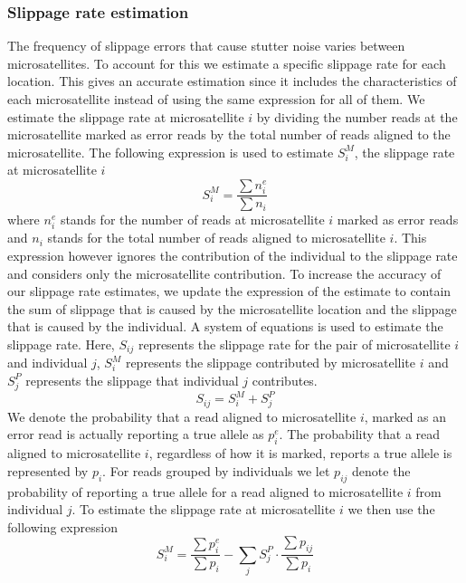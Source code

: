 \documentclass{bioinfo}
\begin{document}
\begin{methods}
\subsubsection{Slippage rate estimation}
The frequency of slippage errors that cause stutter noise varies between microsatellites. To account for this we estimate a specific slippage rate for each location. This gives an accurate estimation since it includes the characteristics of each microsatellite instead of using the same expression for all of them. We estimate the slippage rate at microsatellite $i$ by dividing the number reads at the microsatellite marked as error reads by the total number of reads aligned to the microsatellite.
The following expression is used to estimate $S^M_i$, the slippage rate at microsatellite $i$
\begin{equation}
    S^{M}_i = \frac{\sum n^e_i}{\sum n_i}
\label{eq:SmInit}
\end{equation}
where $n^e_i$ stands for the number of reads at microsatellite $i$ marked as error reads and $n_i$ stands for the total number of reads aligned to microsatellite $i$.
This expression however ignores the contribution of the individual to the slippage rate and considers only the microsatellite contribution.
To increase the accuracy of our slippage rate estimates, we update the expression of the estimate to contain the sum of slippage that is caused by the microsatellite location and the slippage that is caused by the individual.
A system of equations is used to estimate the slippage rate. Here, $S_{ij}$ represents the slippage rate for the pair of microsatellite $i$ and individual $j$, $S^{M}_i$ represents the slippage contributed by microsatellite $i$ and $S^{P}_j$ represents the slippage that individual $j$ contributes.
\begin{equation}
    S_{ij} = S^{M}_i+S^{P}_j 
\end{equation}
We denote the probability that a read aligned to microsatellite $i$, marked as an error read is actually reporting a true allele as $p^e_i$. The probability that a read aligned to microsatellite $i$, regardless of how it is marked, reports a true allele is represented by $p_i$. For reads grouped by individuals we let $p_{ij}$ denote the probability of reporting a true allele for a read aligned to microsatellite $i$ from individual $j$. To estimate the slippage rate at microsatellite $i$ we then use the following expression
\begin{equation}
S^{M}_i = \frac{\sum p^e_i}{\sum p_i} - 
\sum_j S^{P}_j \cdot \frac{\sum p_{ij}}{\sum p_i}

\end{equation}
\end{methods}
\end{document}
